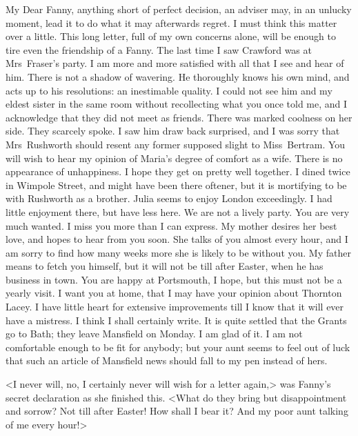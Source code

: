 \begin{mail}{}{My Dear Fanny,}
anything short of perfect decision, an adviser may, in an unlucky moment, lead it to do what it may afterwards regret. I must think this matter over a little. This long letter, full of my own concerns alone, will be enough to tire even the friendship of a Fanny. The last time I saw Crawford was at Mrs~Fraser's party. I am more and more satisfied with all that I see and hear of him. There is not a shadow of wavering. He thoroughly knows his own mind, and acts up to his resolutions: an inestimable quality. I could not see him and my eldest sister in the same room without recollecting what you once told me, and I acknowledge that they did not meet as friends. There was marked coolness on her side. They scarcely spoke. I saw him draw back surprised, and I was sorry that Mrs~Rushworth should resent any former supposed slight to Miss~Bertram. You will wish to hear my opinion of Maria's degree of comfort as a wife. There is no appearance of unhappiness. I hope they get on pretty well together. I dined twice in Wimpole Street, and might have been there oftener, but it is mortifying to be with Rushworth as a brother. Julia seems to enjoy London exceedingly. I had little enjoyment there, but have less here. We are not a lively party. You are very much wanted. I miss you more than I can express. My mother desires her best love, and hopes to hear from you soon. She talks of you almost every hour, and I am sorry to find how many weeks more she is likely to be without you. My father means to fetch you himself, but it will not be till after Easter, when he has business in town. You are happy at Portsmouth, I hope, but this must not be a yearly visit. I want you at home, that I may have your opinion about Thornton Lacey. I have little heart for extensive improvements till I know that it will ever have a mistress. I think I shall certainly write. It is quite settled that the Grants go to Bath; they leave Mansfield on Monday. I am glad of it. I am not comfortable enough to be fit for anybody; but your aunt seems to feel out of luck that such an article of Mansfield news should fall to my pen instead of hers.
\begin{a4}
	\vspace{-0.5em}
	\enlargethispage{\baselineskip}
\end{a4}
\end{mail}

<I never will, no, I certainly never will wish for a letter again,> was Fanny's secret declaration as she finished this. <What do they bring but disappointment and sorrow? Not till after Easter! How shall I bear it? And my poor aunt talking of me every hour!>

